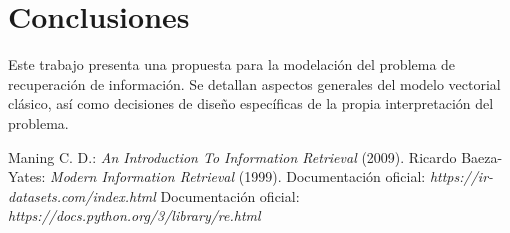 \documentclass{llncs}
\begin{document}
\section{Conclusiones}

	Este trabajo presenta una propuesta para la modelaci\'on del problema de recuperaci\'on de informaci\'on. Se detallan aspectos generales del modelo vectorial cl\'asico, as\'i como decisiones de dise\~no espec\'ificas de la propia interpretaci\'on del problema.

\begin{thebibliography}{20}
	 Maning C. D.: \emph{An Introduction To Information Retrieval} (2009).
	 Ricardo Baeza-Yates: \emph{Modern Information Retrieval} (1999).
         Documentaci\'on oficial: \emph{https://ir-datasets.com/index.html}
         Documentaci\'on oficial: \emph{https://docs.python.org/3/library/re.html}
\end{thebibliography}
\end{document}
